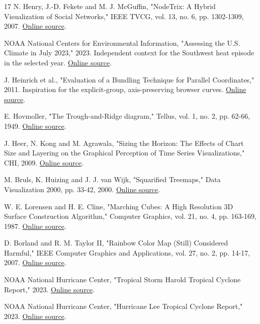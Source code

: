 \documentclass[conference,a4paper]{IEEEtran}
\begin{document}
\begin{thebibliography}{17}
 N. Henry, J.-D. Fekete and M. J. McGuffin, "NodeTrix: A Hybrid Visualization of Social Networks," IEEE TVCG, vol. 13, no. 6, pp. 1302-1309, 2007. \href{https://www.dgp.toronto.edu/~mjmcguff/research/nodetrix/nodetrix.pdf}{Online source}.

 NOAA National Centers for Environmental Information, "Assessing the U.S. Climate in July 2023," 2023. Independent context for the Southwest heat episode in the selected year. \href{https://www.ncei.noaa.gov/news/national-climate-202307}{Online source}.

 J. Heinrich et al., "Evaluation of a Bundling Technique for Parallel Coordinates," 2011. Inspiration for the explicit-group, axis-preserving browser curves. \href{https://arxiv.org/abs/1109.6073}{Online source}.

 E. Hovmoller, "The Trough-and-Ridge diagram," Tellus, vol. 1, no. 2, pp. 62-66, 1949. \href{https://doi.org/10.3402/tellusa.v1i2.8498}{Online source}.

 J. Heer, N. Kong and M. Agrawala, "Sizing the Horizon: The Effects of Chart Size and Layering on the Graphical Perception of Time Series Visualizations," CHI, 2009. \href{https://hci.stanford.edu/publications/2009/heer-horizon-chi09.pdf}{Online source}.

 M. Bruls, K. Huizing and J. J. van Wijk, "Squarified Treemaps," Data Visualization 2000, pp. 33-42, 2000. \href{https://doi.org/10.1007/978-3-7091-6783-0_4}{Online source}.

 W. E. Lorensen and H. E. Cline, "Marching Cubes: A High Resolution 3D Surface Construction Algorithm," Computer Graphics, vol. 21, no. 4, pp. 163-169, 1987. \href{https://doi.org/10.1145/37401.37422}{Online source}.

 D. Borland and R. M. Taylor II, "Rainbow Color Map (Still) Considered Harmful," IEEE Computer Graphics and Applications, vol. 27, no. 2, pp. 14-17, 2007. \href{https://doi.org/10.1109/MCG.2007.46}{Online source}.

 NOAA National Hurricane Center, "Tropical Storm Harold Tropical Cyclone Report," 2023. \href{https://www.nhc.noaa.gov/data/tcr/AL092023_Harold.pdf}{Online source}.

 NOAA National Hurricane Center, "Hurricane Lee Tropical Cyclone Report," 2023. \href{https://www.nhc.noaa.gov/data/tcr/AL132023_Lee.pdf}{Online source}.

\end{thebibliography}
\end{document}
